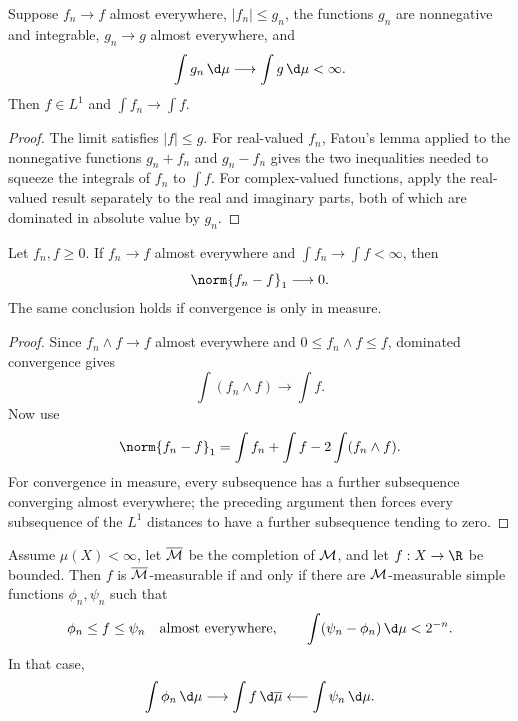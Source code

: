 \begin{thm}
Suppose $f_n\to f$ almost everywhere, $|f_n|\leq g_n$, the functions $g_n$ are nonnegative and integrable, $g_n\to g$ almost everywhere, and
\[
\int g_n\,\d\mu\longrightarrow\int g\,\d\mu<\infty.
\]
Then $f\in L^1$ and $\int f_n\to\int f$.
\end{thm}

\begin{proof}
The limit satisfies $|f|\leq g$. For real-valued $f_n$, Fatou's lemma applied to the nonnegative functions $g_n+f_n$ and $g_n-f_n$ gives the two inequalities needed to squeeze the integrals of $f_n$ to $\int f$. For complex-valued functions, apply the real-valued result separately to the real and imaginary parts, both of which are dominated in absolute value by $g_n$.
\end{proof}

\begin{thm}
Let $f_n,f\geq0$. If $f_n\to f$ almost everywhere and $\int f_n\to\int f<\infty$, then
\[
\norm{f_n-f}_1\longrightarrow0.
\]
The same conclusion holds if convergence is only in measure.
\end{thm}

\begin{proof}
Since $f_n\wedge f\to f$ almost everywhere and $0\leq f_n\wedge f\leq f$, dominated convergence gives
\[
\int(f_n\wedge f)\to\int f.
\]
Now use
\[
\norm{f_n-f}_1
 =\int f_n+\int f-2\int(f_n\wedge f).
\]
For convergence in measure, every subsequence has a further subsequence converging almost everywhere; the preceding argument then forces every subsequence of the $L^1$ distances to have a further subsequence tending to zero.
\end{proof}

\begin{prop}
Assume $\mu(X)<\infty$, let $\overline{\mathcal{M}}$ be the completion of $\mathcal{M}$, and let $f:X\to\R$ be bounded. Then $f$ is $\overline{\mathcal{M}}$-measurable if and only if there are $\mathcal{M}$-measurable simple functions $\phi_n,\psi_n$ such that
\[
\phi_n\leq f\leq\psi_n\quad\text{almost everywhere},
\qquad
\int(\psi_n-\phi_n)\,\d\mu<2^{-n}.
\]
In that case,
\[
\int\phi_n\,\d\mu\longrightarrow\int f\,\d\overline\mu
\longleftarrow\int\psi_n\,\d\mu.
\]
\end{prop}

